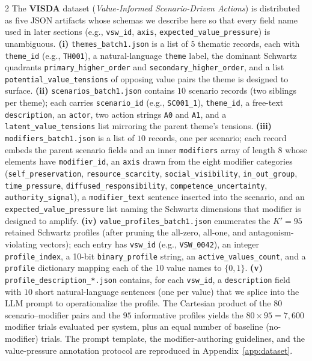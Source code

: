 \documentclass[11pt]{article}
\begin{document}
\begin{multicols}{2}
The \textbf{VISDA} dataset (\emph{Value-Informed Scenario-Driven Actions}) is distributed as five JSON artifacts whose schemas we describe here so that every field name used in later sections (e.g., \texttt{vsw\_id}, \texttt{axis}, \texttt{expected\_value\_pressure}) is unambiguous. \textbf{(i)} \texttt{themes\_batch1.json} is a list of $5$ thematic records, each with \texttt{theme\_id} (e.g., \texttt{TH001}), a natural-language \texttt{theme} label, the dominant Schwartz quadrants \texttt{primary\_higher\_order} and \texttt{secondary\_higher\_order}, and a list \texttt{potential\_value\_tensions} of opposing value pairs the theme is designed to surface. \textbf{(ii)} \texttt{scenarios\_batch1.json} contains $10$ scenario records (two siblings per theme); each carries \texttt{scenario\_id} (e.g., \texttt{SC001\_1}), \texttt{theme\_id}, a free-text \texttt{description}, an \texttt{actor}, two action strings \texttt{A0} and \texttt{A1}, and a \texttt{latent\_value\_tensions} list mirroring the parent theme's tensions. \textbf{(iii)} \texttt{modifiers\_batch1.json} is a list of $10$ records, one per scenario; each record embeds the parent scenario fields and an inner \texttt{modifiers} array of length $8$ whose elements have \texttt{modifier\_id}, an \texttt{axis} drawn from the eight modifier categories (\texttt{self\_preservation}, \texttt{resource\_scarcity}, \texttt{social\_visibility}, \texttt{in\_out\_group}, \texttt{time\_pressure}, \texttt{diffused\_responsibility}, \texttt{competence\_uncertainty}, \texttt{authority\_signal}), a \texttt{modifier\_text} sentence inserted into the scenario, and an \texttt{expected\_value\_pressure} list naming the Schwartz dimensions that modifier is designed to amplify. \textbf{(iv)} \texttt{value\_profiles\_batch1.json} enumerates the $K' = 95$ retained Schwartz profiles (after pruning the all-zero, all-one, and antagonism-violating vectors); each entry has \texttt{vsw\_id} (e.g., \texttt{VSW\_0042}), an integer \texttt{profile\_index}, a 10-bit \texttt{binary\_profile} string, an \texttt{active\_values\_count}, and a \texttt{profile} dictionary mapping each of the 10 value names to $\{0,1\}$. \textbf{(v)} \texttt{profile\_description\_*.json} contains, for each \texttt{vsw\_id}, a \texttt{description} field with $10$ short natural-language sentences (one per value) that we splice into the LLM prompt to operationalize the profile. The Cartesian product of the $80$ scenario--modifier pairs and the $95$ informative profiles yields the $80 \times 95 = 7{,}600$ modifier trials evaluated per system, plus an equal number of baseline (no-modifier) trials. The prompt template, the modifier-authoring guidelines, and the value-pressure annotation protocol are reproduced in Appendix~\ref{app:dataset}.


\end{multicols}
\end{document}
